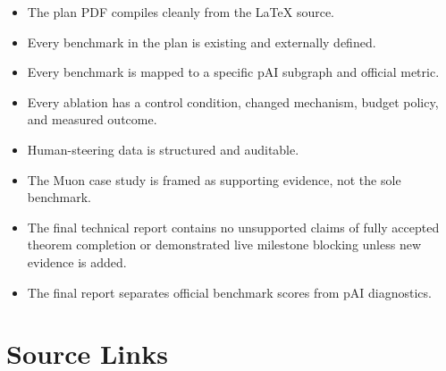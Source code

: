 \documentclass[11pt]{article}
\newcommand{\pai}{pAI}
\begin{document}
\begin{itemize}
  \item The plan PDF compiles cleanly from the LaTeX source.
  \item Every benchmark in the plan is existing and externally defined.
  \item Every benchmark is mapped to a specific \pai{} subgraph and official metric.
  \item Every ablation has a control condition, changed mechanism, budget policy, and measured outcome.
  \item Human-steering data is structured and auditable.
  \item The Muon case study is framed as supporting evidence, not the sole benchmark.
  \item The final technical report contains no unsupported claims of fully accepted theorem completion or demonstrated live milestone blocking unless new evidence is added.
  \item The final report separates official benchmark scores from \pai{} diagnostics.
\end{itemize}

\section*{Source Links}
\end{document}
